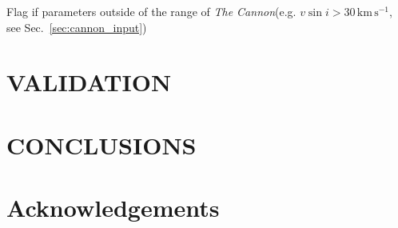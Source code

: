 \documentclass[
  journal=pasa,
  manuscript=research-paper, %
  year=2021,
  volume=37,
]{cup-journal}
\newcommand{\vsini}{$v \sin i$\xspace}
\newcommand{\TheCannon}{\textit{The Cannon}\xspace}
\newcommand{\kms}{\,\mathrm{km\,s^{-1}}}	%
\begin{document}
Flag if parameters outside of the range of \TheCannon (e.g. \vsini$ > 30 \kms$, see Sec.~\ref{sec:cannon_input})

\section{VALIDATION}

\section{CONCLUSIONS}

\section*{Acknowledgements}


\end{document}
